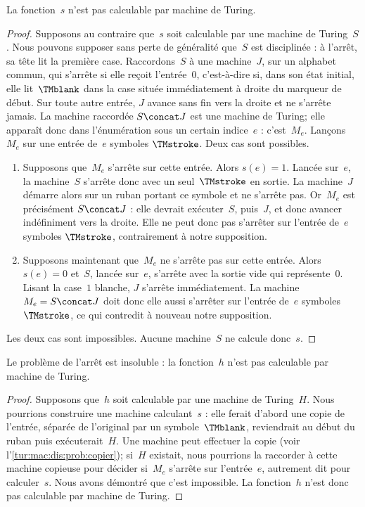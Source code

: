\documentclass[../../../include/open-logic-section]{subfiles}
\begin{document}
\begin{lem}
La fonction~$s$ n'est pas calculable par machine de Turing.
\end{lem}

\begin{proof}
Supposons au contraire que~$s$ soit calculable par une machine
de Turing~$S$. Nous pouvons supposer sans perte de généralité
que~$S$ est disciplinée : à l'arrêt, sa tête lit la première
case. Raccordons~$S$ à une machine~$J$, sur un alphabet commun, qui s'arrête si elle
reçoit l'entrée~$0$, c'est-à-dire si, dans son état initial,
elle lit~$\TMblank$ dans la case située immédiatement à droite
du marqueur de début. Sur toute autre entrée, $J$ avance sans
fin vers la droite et ne s'arrête jamais. La machine raccordée
$S \concat J$ est une machine de Turing; elle apparaît donc dans
l'énumération sous un certain indice~$e$ : c'est~$M_e$.
Lançons~$M_e$ sur une entrée de~$e$ symboles $\TMstroke$.
Deux cas sont possibles.
\begin{enumerate}
\item Supposons que~$M_e$ s'arrête sur cette entrée. Alors
  $s(e)=1$. Lancée sur~$e$, la machine~$S$ s'arrête donc avec
  un seul~$\TMstroke$ en sortie. La machine~$J$ démarre alors
  sur un ruban portant ce symbole et ne s'arrête pas. Or~$M_e$
  est précisément $S \concat J$ : elle devrait exécuter~$S$,
  puis~$J$, et donc avancer indéfiniment vers la droite. Elle
  ne peut donc pas s'arrêter sur l'entrée de~$e$ symboles
  $\TMstroke$, contrairement à notre supposition.

\item Supposons maintenant que~$M_e$ ne s'arrête pas sur cette
  entrée. Alors $s(e)=0$ et~$S$, lancée sur~$e$, s'arrête avec
  la sortie vide qui représente~$0$. Lisant la case~$1$ blanche, $J$ s'arrête
  immédiatement. La machine~$M_e=S \concat J$ doit donc elle
  aussi s'arrêter sur l'entrée de~$e$ symboles $\TMstroke$,
  ce qui contredit à nouveau notre supposition.
\end{enumerate}
Les deux cas sont impossibles. Aucune machine~$S$ ne calcule
donc~$s$.
\end{proof}

\begin{thm}
Le problème de l'arrêt est insoluble : la fonction~$h$ n'est
pas calculable par machine de Turing.
\end{thm}

\begin{proof}
Supposons que~$h$ soit calculable par une machine de Turing~$H$.
Nous pourrions construire une machine calculant~$s$ : elle ferait
d'abord une copie de l'entrée, séparée de l'original par un
symbole~$\TMblank$, reviendrait au début du ruban puis
exécuterait~$H$. Une machine peut effectuer la copie
(voir l'\cref{tur:mac:dis:prob:copier}); si~$H$ existait,
nous pourrions la raccorder à cette machine copieuse pour
décider si~$M_e$ s'arrête sur l'entrée~$e$, autrement dit
pour calculer~$s$. Nous avons démontré que c'est impossible.
La fonction~$h$ n'est donc pas calculable par machine de Turing.
\end{proof}
\end{document}
